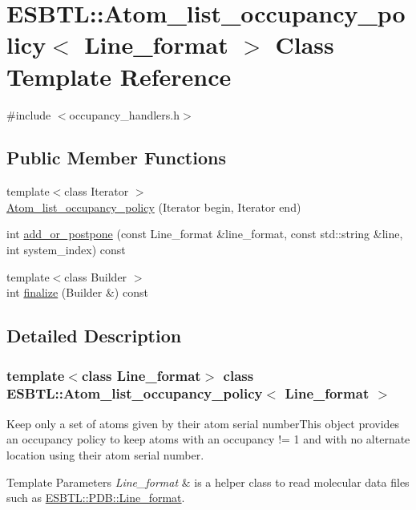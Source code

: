 \hypertarget{classESBTL_1_1Atom__list__occupancy__policy}{}\section{E\+S\+B\+TL\+:\+:Atom\+\_\+list\+\_\+occupancy\+\_\+policy$<$ Line\+\_\+format $>$ Class Template Reference}
\label{classESBTL_1_1Atom__list__occupancy__policy}


{\ttfamily \#include $<$occupancy\+\_\+handlers.\+h$>$}

\subsection*{Public Member Functions}
\begin{DoxyCompactItemize}
\item 
{\footnotesize template$<$class Iterator $>$ }\\\hyperlink{classESBTL_1_1Atom__list__occupancy__policy_a8f593573fdb7dc861a33c1a2cc42a39f}{Atom\+\_\+list\+\_\+occupancy\+\_\+policy} (Iterator begin, Iterator end)
\item 
int \hyperlink{classESBTL_1_1Atom__list__occupancy__policy_a65617fb0659dcd05e6185f02ab6c8734}{add\+\_\+or\+\_\+postpone} (const Line\+\_\+format \&line\+\_\+format, const std\+::string \&line, int system\+\_\+index) const
\item 
{\footnotesize template$<$class Builder $>$ }\\int \hyperlink{classESBTL_1_1Atom__list__occupancy__policy_a6e79bcfed595d2fd2dae424873f9236e}{finalize} (Builder \&) const
\end{DoxyCompactItemize}


\subsection{Detailed Description}
\subsubsection*{template$<$class Line\+\_\+format$>$\newline
class E\+S\+B\+T\+L\+::\+Atom\+\_\+list\+\_\+occupancy\+\_\+policy$<$ Line\+\_\+format $>$}

Keep only a set of atoms given by their atom serial number\+This object provides an occupancy policy to keep atoms with an occupancy != 1 and with no alternate location using their atom serial number. 
\begin{DoxyTemplParams}{Template Parameters}
{\em Line\+\_\+format} & is a helper class to read molecular data files such as \hyperlink{classESBTL_1_1PDB_1_1Line__format}{E\+S\+B\+T\+L\+::\+P\+D\+B\+::\+Line\+\_\+format}. \\
\hline
\end{DoxyTemplParams}


